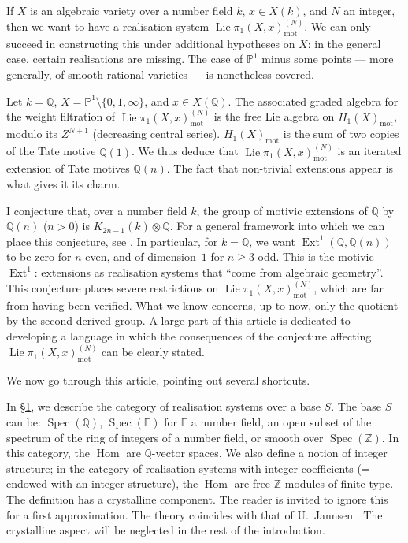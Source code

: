 \documentclass{article}
\theoremstyle{definition}
\newcommand{\mot}{\mathrm{mot}}
\newcommand{\bb}{\mathbb}
\newcommand{\PP}{\bb{P}}
\newcommand{\ZZ}{\bb{Z}}
\newcommand{\FF}{\bb{F}}
\newcommand{\QQ}{\bb{Q}}
\renewcommand{\geq}{\geqslant}
\DeclareMathOperator{\Lie}{Lie}
\DeclareMathOperator{\Ext}{Ext}
\DeclareMathOperator{\Spec}{Spec}
\DeclareMathOperator{\Hom}{Hom}
\newcommand{\oldpage}[1]{\marginpar{\footnotesize$\Big\vert$ \textit{p.~#1}}}
\begin{document}
If $X$ is an algebraic variety over a number field $k$, $x\in X(k)$, and $N$ an integer, then we want to have a realisation system $\Lie\pi_1(X,x)_\mot^{(N)}$.
We can only succeed in constructing this under additional hypotheses on $X$: in the general case, certain realisations are missing.
The case of $\PP^1$ minus some points --- more generally, of smooth rational varieties --- is nonetheless covered.

Let $k=\QQ$, $X=\PP^1\setminus\{0,1,\infty\}$, and $x\in X(\QQ)$.
The associated graded algebra for the weight filtration of $\Lie\pi_1(X,x)_\mot^{(N)}$ is the free Lie algebra on $H_1(X)_\mot$, modulo its $Z^{N+1}$ (decreasing central series).
$H_1(X)_\mot$ is the sum of two copies of the Tate motive $\QQ(1)$.
We thus deduce that $\Lie\pi_1(X,x)_\mot^{(N)}$ is an iterated extension of Tate motives $\QQ(n)$.
The fact that non-trivial extensions appear is what gives it its charm.

I conjecture that, over a number field $k$, the group of motivic extensions of $\QQ$ by $\QQ(n)$ ($n>0$) is $K_{2n-1}(k)\otimes\QQ$.
For a general framework into which we can place this conjecture, see \cite[§5]{B}.
In particular, for $k=\QQ$, we want $\Ext^1(\QQ,\QQ(n))$ to be zero for $n$ even, and of dimension~$1$ for $n\geq3$ odd.
This is the motivic $\Ext^1$: extensions as realisation systems that ``come from algebraic geometry''.
This conjecture places severe restrictions on $\Lie\pi_1(X,x)_\mot^{(N)}$, which are far from having been verified.
What we know concerns, up to now, only the quotient by the second derived group.
A large part of this article is dedicated to developing a language in which the consequences of the conjecture affecting $\Lie\pi_1(X,x)_\mot^{(N)}$ can be clearly stated.

We now go through this article, pointing out several shortcuts.

In \hyperref[1]{\S1}, we describe the category of realisation systems over a base $S$.
The base $S$ can be: $\Spec(\QQ)$, $\Spec(\FF)$ for $\FF$ a number field, an open subset of the spectrum of the ring of integers of a number field, or smooth over $\Spec(\ZZ)$.
In this category, the $\Hom$ are $\QQ$-vector spaces.
We also define a notion of integer structure;
in the category of realisation systems with integer coefficients (= endowed with an integer structure), the $\Hom$ are free $\ZZ$-modules of finite type.
The definition has a crystalline component.
The reader is invited to ignore this for a first approximation.
The theory coincides with that of U.~Jannsen
\oldpage{84}
\cite{J}.
The crystalline aspect will be neglected in the rest of the introduction.
\end{document}
